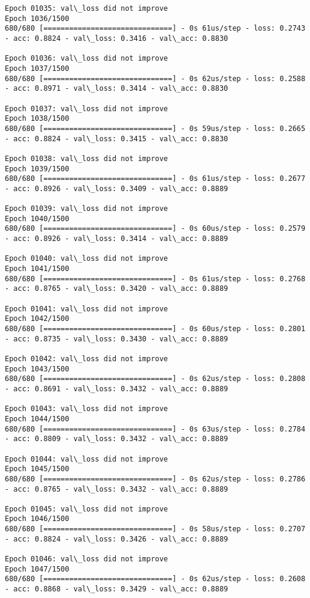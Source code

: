 \documentclass[11pt]{article}
\begin{document}
\begin{Verbatim}[commandchars=\\\{\}]
Epoch 01035: val\_loss did not improve
Epoch 1036/1500
680/680 [==============================] - 0s 61us/step - loss: 0.2743 - acc: 0.8824 - val\_loss: 0.3416 - val\_acc: 0.8830

Epoch 01036: val\_loss did not improve
Epoch 1037/1500
680/680 [==============================] - 0s 62us/step - loss: 0.2588 - acc: 0.8971 - val\_loss: 0.3414 - val\_acc: 0.8830

Epoch 01037: val\_loss did not improve
Epoch 1038/1500
680/680 [==============================] - 0s 59us/step - loss: 0.2665 - acc: 0.8824 - val\_loss: 0.3415 - val\_acc: 0.8830

Epoch 01038: val\_loss did not improve
Epoch 1039/1500
680/680 [==============================] - 0s 61us/step - loss: 0.2677 - acc: 0.8926 - val\_loss: 0.3409 - val\_acc: 0.8889

Epoch 01039: val\_loss did not improve
Epoch 1040/1500
680/680 [==============================] - 0s 60us/step - loss: 0.2579 - acc: 0.8926 - val\_loss: 0.3414 - val\_acc: 0.8889

Epoch 01040: val\_loss did not improve
Epoch 1041/1500
680/680 [==============================] - 0s 61us/step - loss: 0.2768 - acc: 0.8765 - val\_loss: 0.3420 - val\_acc: 0.8889

Epoch 01041: val\_loss did not improve
Epoch 1042/1500
680/680 [==============================] - 0s 60us/step - loss: 0.2801 - acc: 0.8735 - val\_loss: 0.3430 - val\_acc: 0.8889

Epoch 01042: val\_loss did not improve
Epoch 1043/1500
680/680 [==============================] - 0s 62us/step - loss: 0.2808 - acc: 0.8691 - val\_loss: 0.3432 - val\_acc: 0.8889

Epoch 01043: val\_loss did not improve
Epoch 1044/1500
680/680 [==============================] - 0s 63us/step - loss: 0.2784 - acc: 0.8809 - val\_loss: 0.3432 - val\_acc: 0.8889

Epoch 01044: val\_loss did not improve
Epoch 1045/1500
680/680 [==============================] - 0s 62us/step - loss: 0.2786 - acc: 0.8765 - val\_loss: 0.3432 - val\_acc: 0.8889

Epoch 01045: val\_loss did not improve
Epoch 1046/1500
680/680 [==============================] - 0s 58us/step - loss: 0.2707 - acc: 0.8824 - val\_loss: 0.3426 - val\_acc: 0.8889

Epoch 01046: val\_loss did not improve
Epoch 1047/1500
680/680 [==============================] - 0s 62us/step - loss: 0.2608 - acc: 0.8868 - val\_loss: 0.3429 - val\_acc: 0.8889


\end{Verbatim}
\end{document}
